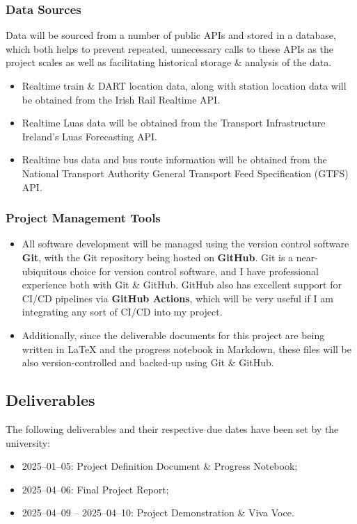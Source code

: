 \documentclass[a4paper,11pt]{article}
\begin{document}
\subsubsection{Data Sources}
Data will be sourced from a number of public APIs and stored in a database, which both helps to prevent repeated, unnecessary calls to these APIs as the project scales as well as facilitating historical storage \& analysis of the data.
\begin{itemize}
    \item   Realtime train \& DART location data, along with station location data will be obtained from the Irish Rail Realtime API\supercite{trains}.
    \item   Realtime Luas data will be obtained from the Transport Infrastructure Ireland's Luas Forecasting API\supercite{luas}.
    \item   Realtime bus data and bus route information will be obtained from the National Transport Authority General Transport Feed Specification (GTFS) API\supercite{gtfs}.
\end{itemize}

\subsubsection{Project Management Tools}
\begin{itemize}
    \item   All software development will be managed using the version control software \textbf{Git}\supercite{git}, with the Git repository being hosted on \textbf{GitHub}\supercite{github}.
        Git is a near-ubiquitous choice for version control software, and I have professional experience both with Git \& GitHub.
        GitHub also has excellent support for CI/CD pipelines via \textbf{GitHub Actions}\supercite{actions}, which will be very useful if I am integrating any sort of CI/CD into my project.

    \item   Additionally, since the deliverable documents for this project are being written in {\LaTeX} and the progress notebook in Markdown, these files will be also version-controlled and backed-up using Git \& GitHub.
\end{itemize}

\subsection{Deliverables}
The following deliverables and their respective due dates have been set by the university:
\begin{itemize}
    \item   2025–01–05: Project Definition Document \& Progress Notebook;
    \item   2025–04–06: Final Project Report;
    \item   2025–04–09 – 2025–04–10: Project Demonstration \& Viva Voce.
\end{itemize}
\end{document}
